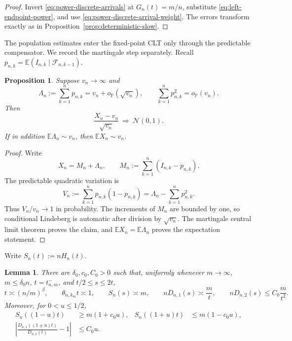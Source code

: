 \documentclass[11pt]{article}
\newtheorem{proposition}[theorem]{Proposition}
\newtheorem{lemma}[theorem]{Lemma}
\theoremstyle{remark}
\theoremstyle{plain}
\newcommand{\E}{\mathbb E}
\newcommand{\Pp}{\mathbb P}
\newcommand{\cF}{\mathcal F}
\begin{document}
\begin{proof}
Invert \eqref{eq:power-discrete-arrivals} at $G_n(t)=m/n$, substitute
\eqref{eq:left-endpoint-power}, and use
\eqref{eq:power-discrete-arrival-weight}.  The errors transform exactly as
in Proposition~\ref{prop:deterministic-slow}.
\end{proof}

The population estimates enter the fixed-point CLT only through the
predictable compensator.  We record the martingale step separately.  Recall
$p_{n,k}=\E(I_{n,k}\mid\cF_{n,k-1})$.

\begin{proposition}\label{prop:conditional-clt}
Suppose $v_n\to\infty$ and
\begin{equation}\label{eq:conditional-clt-input}
 \Lambda_n:=\sum_{k=1}^np_{n,k}
 =v_n+o_{\Pp}(\sqrt{v_n}),
 \qquad
 \sum_{k=1}^np_{n,k}^2=o_{\Pp}(v_n).
\end{equation}
Then
\[
 \frac{X_n-v_n}{\sqrt{v_n}}
 \ \Longrightarrow\ \mathcal N(0,1).
\]
If in addition $\E\Lambda_n\sim v_n$, then $\E X_n\sim v_n$.
\end{proposition}

\begin{proof}
Write
\begin{equation}\label{eq:martingale-decomp}
 X_n=M_n+\Lambda_n,\qquad
 M_n:=\sum_{k=1}^n(I_{n,k}-p_{n,k}).
\end{equation}
The predictable quadratic variation is
\begin{equation}\label{eq:quadratic-variation}
 V_n:=\sum_{k=1}^np_{n,k}(1-p_{n,k})
 =\Lambda_n-\sum_{k=1}^np_{n,k}^2.
\end{equation}
Thus $V_n/v_n\to1$ in probability.  The increments of $M_n$ are
bounded by one, so conditional Lindeberg is automatic after division by
$\sqrt{v_n}$.  The martingale central limit theorem
\cite{hall1980martingale} proves the claim, and $\E X_n=\E\Lambda_n$ proves
the expectation statement.
\end{proof}

Write $S_n(t):=nH_n(t)$.

\begin{lemma}
\label{lem:rough-slow}
There are $\delta_0,c_0,C_0>0$ such that, uniformly whenever
$m\to\infty$, $m\le\delta_0n$, $t=t_{n,m}^-$, and $t/2\le s\le2t$,
\begin{equation}\label{eq:rough-slow}
 t\asymp(n/m)^\beta,\qquad
 \theta_{n,k_m}t\asymp1,\qquad
 S_n(s)\asymp m,\qquad
 nD_{n,1}(s)\asymp\frac mt,\qquad
 nD_{n,2}(s)\le C_0\frac m{t^2}.
\end{equation}
Moreover, for $0<u\le1/2$,
\begin{align}
 S_n((1-u)t)&\ge m(1+c_0u),&
 S_n((1+u)t)&\le m(1-c_0u),
 \label{eq:count-mean-separation}\\
 \left|\frac{D_{n,1}((1\pm u)t)}{D_{n,1}(t)}-1\right|
 &\le C_0u.&&\label{eq:weight-mean-stability}
\end{align}
\end{lemma}
\end{document}
